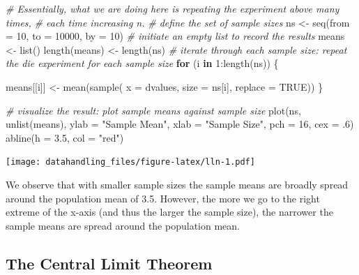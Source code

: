 \documentclass[
  12pt,
]{style/krantz}
\newenvironment{Shaded}{\begin{snugshade}}{\end{snugshade}}
\newcommand{\AttributeTok}[1]{\textcolor[rgb]{0.77,0.63,0.00}{#1}}
\newcommand{\CommentTok}[1]{\textcolor[rgb]{0.56,0.35,0.01}{\textit{#1}}}
\newcommand{\ConstantTok}[1]{\textcolor[rgb]{0.00,0.00,0.00}{#1}}
\newcommand{\ControlFlowTok}[1]{\textcolor[rgb]{0.13,0.29,0.53}{\textbf{#1}}}
\newcommand{\DecValTok}[1]{\textcolor[rgb]{0.00,0.00,0.81}{#1}}
\newcommand{\FloatTok}[1]{\textcolor[rgb]{0.00,0.00,0.81}{#1}}
\newcommand{\FunctionTok}[1]{\textcolor[rgb]{0.00,0.00,0.00}{#1}}
\newcommand{\NormalTok}[1]{#1}
\newcommand{\OtherTok}[1]{\textcolor[rgb]{0.56,0.35,0.01}{#1}}
\newcommand{\SpecialCharTok}[1]{\textcolor[rgb]{0.00,0.00,0.00}{#1}}
\newcommand{\StringTok}[1]{\textcolor[rgb]{0.31,0.60,0.02}{#1}}
\begin{document}
\begin{Shaded}
\begin{Highlighting}[]
\CommentTok{\# Essentially, what we are doing here is repeating the experiment above many times, }
\CommentTok{\# each time increasing n.}
\CommentTok{\# define the set of sample sizes}
\NormalTok{ns }\OtherTok{\textless{}{-}} \FunctionTok{seq}\NormalTok{(}\AttributeTok{from =} \DecValTok{10}\NormalTok{, }\AttributeTok{to =} \DecValTok{10000}\NormalTok{, }\AttributeTok{by =} \DecValTok{10}\NormalTok{)}
\CommentTok{\# initiate an empty list to record the results}
\NormalTok{means }\OtherTok{\textless{}{-}} \FunctionTok{list}\NormalTok{()}
\FunctionTok{length}\NormalTok{(means) }\OtherTok{\textless{}{-}} \FunctionTok{length}\NormalTok{(ns)}
\CommentTok{\# iterate through each sample size: \textquotesingle{}repeat the die experiment for each sample size\textquotesingle{}}
\ControlFlowTok{for}\NormalTok{ (i }\ControlFlowTok{in} \DecValTok{1}\SpecialCharTok{:}\FunctionTok{length}\NormalTok{(ns)) \{}
     
\NormalTok{     means[[i]] }\OtherTok{\textless{}{-}} \FunctionTok{mean}\NormalTok{(}\FunctionTok{sample}\NormalTok{( }\AttributeTok{x =}\NormalTok{ dvalues,}
                                \AttributeTok{size =}\NormalTok{ ns[i],}
                                \AttributeTok{replace =} \ConstantTok{TRUE}\NormalTok{))}
\NormalTok{\}}

\CommentTok{\# visualize the result: plot sample means against sample size}
\FunctionTok{plot}\NormalTok{(ns, }\FunctionTok{unlist}\NormalTok{(means),}
     \AttributeTok{ylab =} \StringTok{"Sample Mean"}\NormalTok{,}
     \AttributeTok{xlab =} \StringTok{"Sample Size"}\NormalTok{,}
     \AttributeTok{pch =} \DecValTok{16}\NormalTok{,}
     \AttributeTok{cex =}\NormalTok{ .}\DecValTok{6}\NormalTok{)}
\FunctionTok{abline}\NormalTok{(}\AttributeTok{h =} \FloatTok{3.5}\NormalTok{, }\AttributeTok{col =} \StringTok{"red"}\NormalTok{)}
\end{Highlighting}
\end{Shaded}

\texttt{[image: datahandling\_files/figure-latex/lln-1.pdf]}

We observe that with smaller sample sizes the sample means are broadly spread around the population mean of 3.5. However, the more we go to the right extreme of the x-axis (and thus the larger the sample size), the narrower the sample means are spread around the population mean.

\hypertarget{the-central-limit-theorem}{%
\subsection{The Central Limit Theorem}\label{the-central-limit-theorem}}
\end{document}
